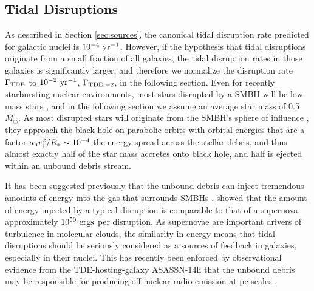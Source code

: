 \documentclass[preprint2]{aastex}
\begin{document}
\subsection{Tidal Disruptions}\label{subsec:tde}
As described in Section \ref{sec:sources}, the canonical tidal disruption rate predicted for galactic nuclei is $10^{-4}~{\rm yr}^{-1}$. However, if the hypothesis that tidal disruptions originate from a small fraction of all galaxies, the tidal disruption rates in those galaxies is significantly larger, and therefore we normalize the disruption rate $\Gamma_{\rm TDE}$ to $10^{-2}~{\rm yr}^{-1}$, $\Gamma_{\rm TDE, -2}$, in the following section. Even for recently starbursting nuclear environments, most stars disrupted by a SMBH will be low-mass stars \citep{Kochanek:2016a}, and in the following section we assume an average star mass of 0.5 $M_{\odot}$. As most disrupted stars will originate from the SMBH's sphere of influence \citep{Lightman:1977a}, they approach the black hole on parabolic orbits with orbital energies that are a factor $a_{\rm h} r_{\rm t}^{2} / R_{\ast} \sim 10^{-4}$ the energy spread across the stellar debris, and thus almost exactly half of the star mass accretes onto black hole, and half is ejected within an unbound debris stream.

It has been suggested previously that the unbound debris can inject tremendous amounts of energy into the gas that surrounds SMBHs \citep{Khokhlov:1996a}. \citeauthor{Guillochon:2016b} showed that the amount of energy injected by a typical disruption is comparable to that of a supernova, approximately $10^{50}~{\rm ergs}$ per disruption. As supernovae are important drivers of turbulence in molecular clouds, the similarity in energy means that tidal disruptions should be seriously considered as a sources of feedback in galaxies, especially in their nuclei. This has recently been enforced by observational evidence from the TDE-hosting-galaxy ASASSN-14li that the unbound debris may be responsible for producing off-nuclear radio emission at pc scales \citep{Romero-Canizales:2016a}.
\end{document}
